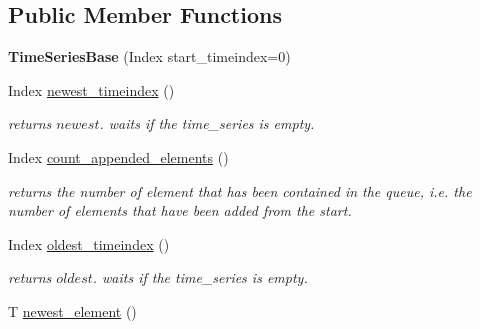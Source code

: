 \subsection*{Public Member Functions}
\begin{DoxyCompactItemize}
\item 
{\bfseries Time\+Series\+Base} (Index start\+\_\+timeindex=0)\hypertarget{classtime__series_1_1internal_1_1TimeSeriesBase_a60aa9cdab364cd01a5f070bb75c187a3}{}\label{classtime__series_1_1internal_1_1TimeSeriesBase_a60aa9cdab364cd01a5f070bb75c187a3}

\item 
Index \hyperlink{classtime__series_1_1internal_1_1TimeSeriesBase_aac02c35ae67fad14a3567dd01565d058}{newest\+\_\+timeindex} ()\hypertarget{classtime__series_1_1internal_1_1TimeSeriesBase_aac02c35ae67fad14a3567dd01565d058}{}\label{classtime__series_1_1internal_1_1TimeSeriesBase_aac02c35ae67fad14a3567dd01565d058}

\begin{DoxyCompactList}\small\item\em returns $ newest $. waits if the time\+\_\+series is empty. \end{DoxyCompactList}\item 
Index \hyperlink{classtime__series_1_1internal_1_1TimeSeriesBase_a1e384606bee9664d05803f33235a0d60}{count\+\_\+appended\+\_\+elements} ()\hypertarget{classtime__series_1_1internal_1_1TimeSeriesBase_a1e384606bee9664d05803f33235a0d60}{}\label{classtime__series_1_1internal_1_1TimeSeriesBase_a1e384606bee9664d05803f33235a0d60}

\begin{DoxyCompactList}\small\item\em returns the number of element that has been contained in the queue, i.\+e. the number of elements that have been added from the start. \end{DoxyCompactList}\item 
Index \hyperlink{classtime__series_1_1internal_1_1TimeSeriesBase_ace0e19f7ce8e25e50cb704ba58a80d35}{oldest\+\_\+timeindex} ()\hypertarget{classtime__series_1_1internal_1_1TimeSeriesBase_ace0e19f7ce8e25e50cb704ba58a80d35}{}\label{classtime__series_1_1internal_1_1TimeSeriesBase_ace0e19f7ce8e25e50cb704ba58a80d35}

\begin{DoxyCompactList}\small\item\em returns $ oldest $. waits if the time\+\_\+series is empty. \end{DoxyCompactList}\item 
T \hyperlink{classtime__series_1_1internal_1_1TimeSeriesBase_a12bd405933d326fd8396fb2bc1267223}{newest\+\_\+element} ()\hypertarget{classtime__series_1_1internal_1_1TimeSeriesBase_a12bd405933d326fd8396fb2bc1267223}{}\label{classtime__series_1_1internal_1_1TimeSeriesBase_a12bd405933d326fd8396fb2bc1267223}


\end{DoxyCompactItemize}
